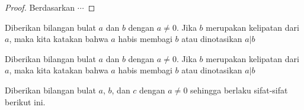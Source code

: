 \begin{proof}
	Berdasarkan $\cdots$
\end{proof}

\begin{definition}
	Diberikan bilangan bulat $a$ dan $b$ dengan $a \neq 0$. Jika $b$ merupakan kelipatan dari $a$, maka kita katakan bahwa  $a$ habis membagi $b$ atau dinotasikan $a|b$
\end{definition}

\begin{example}
	Diberikan bilangan bulat $a$ dan $b$ dengan $a \neq 0$. Jika $b$ merupakan kelipatan dari $a$, maka kita katakan bahwa  $a$ habis membagi $b$ atau dinotasikan $a|b$
\end{example}

\begin{theorem}
	Diberikan bilangan bulat  $a$, $b$, dan $c$ dengan $a \neq 0$ sehingga berlaku sifat-sifat berikut ini.
\end{theorem}

